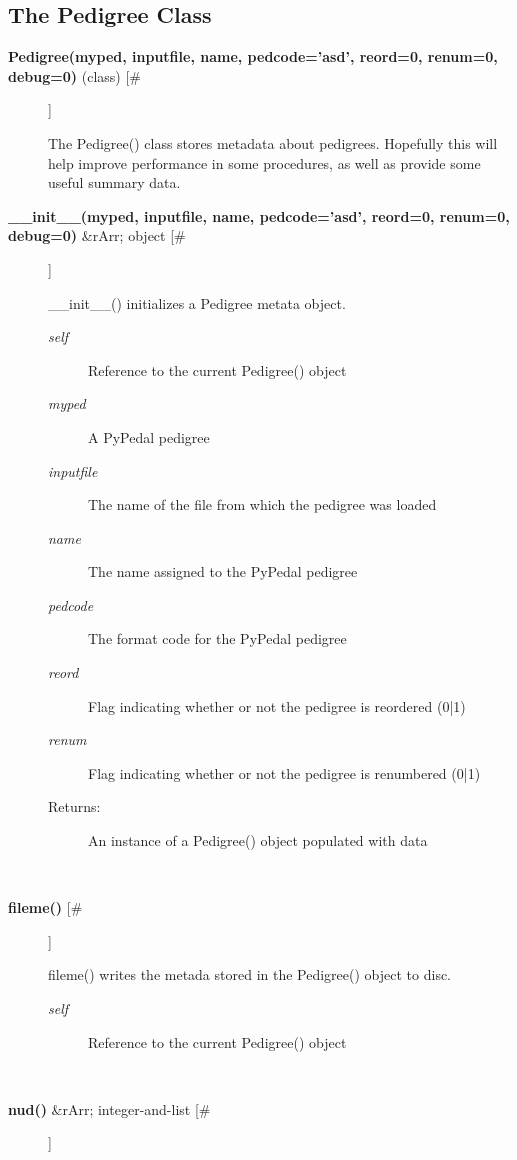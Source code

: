 \documentclass[10pt]{article}
\begin{document}
\subsection*{The Pedigree Class}
\begin{description}
\item[\textbf{Pedigree(myped, inputfile, name, pedcode='asd', reord=0, renum=0, debug=0)}
 (class) [\#]]

 The Pedigree() class stores metadata about pedigrees. Hopefully this will help improve performance in some procedures, as well as provide some useful summary data.

\item[\textbf{\_\_init\_\_(myped, inputfile, name, pedcode='asd', reord=0, renum=0, debug=0)}
 \&rArr; object [\#]]

 \_\_init\_\_() initializes a Pedigree metata object.
\begin{description}
\item[\emph{self}
] Reference to the current Pedigree() object
\item[\emph{myped}
] A PyPedal pedigree
\item[\emph{inputfile}
] The name of the file from which the pedigree was loaded
\item[\emph{name}
] The name assigned to the PyPedal pedigree
\item[\emph{pedcode}
] The format code for the PyPedal pedigree
\item[\emph{reord}
] Flag indicating whether or not the pedigree is reordered (0|1)
\item[\emph{renum}
] Flag indicating whether or not the pedigree is renumbered (0|1)
\item[Returns:] An instance of a Pedigree() object populated with data

\end{description}
\\ 

\item[\textbf{fileme()}
 [\#]]

 fileme() writes the metada stored in the Pedigree() object to disc.
\begin{description}
\item[\emph{self}
] Reference to the current Pedigree() object

\end{description}
\\ 

\item[\textbf{nud()}
 \&rArr; integer-and-list [\#]]


\end{description}
\end{document}
